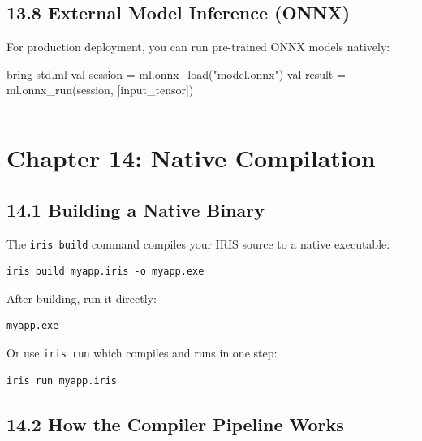 \documentclass[
  english,
]{book}
\newenvironment{Shaded}{\begin{snugshade}}{\end{snugshade}}
\newcommand{\NormalTok}[1]{\textcolor[rgb]{0.83,0.83,0.83}{#1}}
\newcommand{\OperatorTok}[1]{\textcolor[rgb]{0.83,0.83,0.83}{#1}}
\newcommand{\StringTok}[1]{\textcolor[rgb]{0.81,0.57,0.47}{#1}}
\begin{document}
\subsection{13.8 External Model Inference
(ONNX)}\label{external-model-inference-onnx}

For production deployment, you can run pre-trained ONNX models natively:

\begin{Shaded}
\begin{Highlighting}[]
\NormalTok{bring std}\OperatorTok{.}\NormalTok{ml}
\NormalTok{val session }\OperatorTok{=}\NormalTok{ ml}\OperatorTok{.}\NormalTok{onnx\_load(}\StringTok{"model.onnx"}\NormalTok{)}
\NormalTok{val result }\OperatorTok{=}\NormalTok{ ml}\OperatorTok{.}\NormalTok{onnx\_run(session}\OperatorTok{,}\NormalTok{ [input\_tensor])}
\end{Highlighting}
\end{Shaded}

\begin{center}\rule{0.5\linewidth}{0.5pt}\end{center}

\section{Chapter 14: Native
Compilation}\label{chapter-14-native-compilation}

\subsection{14.1 Building a Native
Binary}\label{building-a-native-binary}

The \texttt{iris\ build} command compiles your IRIS source to a native
executable:

\begin{verbatim}
iris build myapp.iris -o myapp.exe
\end{verbatim}

After building, run it directly:

\begin{verbatim}
myapp.exe
\end{verbatim}

Or use \texttt{iris\ run} which compiles and runs in one step:

\begin{verbatim}
iris run myapp.iris
\end{verbatim}

\subsection{14.2 How the Compiler Pipeline
Works}\label{how-the-compiler-pipeline-works}
\end{document}
